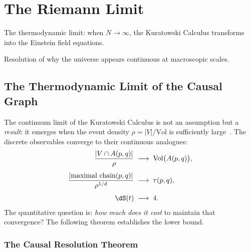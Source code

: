 \chapter{The Riemann Limit}
%

\begin{introduction}
  \item The thermodynamic limit: when $N \to \infty$, the Kuratowski
        Calculus transforms into the Einstein field equations.
  \item Resolution of why the universe appears continuous at macroscopic
        scales.
\end{introduction}

\section{The Thermodynamic Limit of the Causal Graph}

The continuum limit of the Kuratowski Calculus is not an assumption
but a \emph{result}: it emerges when the event density
$\rho = |V|/\mathrm{Vol}$ is sufficiently
large~\cite{bombelli1987,surya2019,major2007}. The discrete
observables converge to their continuous analogues:
%
\begin{align}
  \frac{|V \cap A(p,q)|}{\rho} &\;\longrightarrow\; \mathrm{Vol}\bigl(A(p,q)\bigr),
  \label{eq:vol-limit}\\[4pt]
  \frac{|\text{maximal chain}(p,q)|}{\rho^{1/d}}
  &\;\longrightarrow\; \tau(p,q),
  \label{eq:tau-limit}\\[4pt]
  \dS(t) &\;\longrightarrow\; 4.
  \label{eq:ds-limit}
\end{align}
%
The quantitative question is: \textit{how much does it cost} to
maintain that convergence? The following theorem establishes the lower
bound.

\subsection{The Causal Resolution Theorem}

